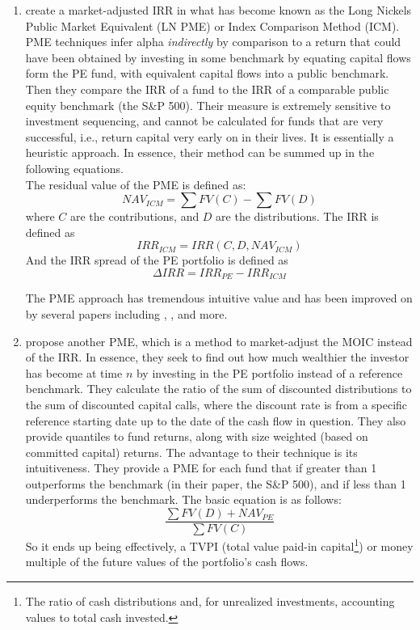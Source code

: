 \documentclass[final,5p,times,twocolumn,authoryear]{elsarticle}
\begin{document}
\begin{enumerate}[resume, label=(\roman*)]
	\item \cite{Long1996} create a market-adjusted IRR in what has become known as the Long Nickels Public Market Equivalent (LN PME) or Index Comparison Method (ICM). PME techniques infer alpha \emph{indirectly} by comparison to a return that could have been obtained by investing in some benchmark by equating capital flows form the PE fund, with equivalent capital flows into a public benchmark. Then they compare the IRR of a fund to the IRR of a comparable public equity benchmark (the S\&P 500). Their measure is extremely sensitive to investment sequencing, and cannot be calculated for funds that are very successful, i.e., return capital very early on in their lives. It is essentially a heuristic approach. In essence, their method can be summed up in the following equations. \\
	
	The residual value of the PME is defined as:
	\begin{equation}
		NAV_{ICM} = \sum FV(C) - \sum FV(D)
	\end{equation}
	where $C$ are the contributions, and $D$ are the distributions. The IRR is defined as
	\begin{equation}
		IRR_{ICM} = IRR(C, D, NAV_{ICM})
	\end{equation}
	And the IRR spread of the PE portfolio is defined as
	\begin{equation}
		\Delta IRR = IRR_{PE} - IRR_{ICM}
	\end{equation}

	The PME approach has tremendous intuitive value and has been improved on by several papers including \cite{Rouvinez2003}, \cite{Cambridge2013}, and more.

	\item \cite{Kaplan2005} propose another PME, which is a method to market-adjust the MOIC instead of the IRR. In essence, they seek to find out how much wealthier the investor has become at time $n$ by investing in the PE portfolio instead of a reference benchmark. They calculate the ratio of the sum of discounted distributions to the sum of discounted capital calls, where the discount rate is from a specific reference starting date up to the date of the cash flow in question. They also provide quantiles to fund returns, along with size weighted (based on committed capital) returns. The advantage to their technique is its intuitiveness. They provide a PME for each fund that if greater than 1 outperforms the benchmark (in their paper, the S\&P 500), and if less than 1 underperforms the benchmark. The basic equation is as follows:
	\begin{equation}
		\frac{\sum FV(D) + NAV_{PE}}{\sum FV(C)}
	\end{equation}
	So it ends up being effectively, a TVPI (total value paid-in capital\footnote{The ratio of cash distributions and, for unrealized investments, accounting values to total cash invested.}) or money multiple of the future values of the portfolio's cash flows. 
	

\end{enumerate}
\end{document}
